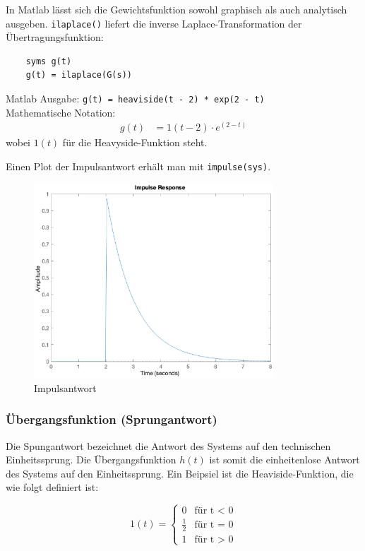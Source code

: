 In Matlab lässt sich die Gewichtsfunktion sowohl graphisch als auch analytisch ausgeben.
\texttt{ilaplace()} liefert die inverse Laplace-Transformation der Übertragungsfunktion:
\begin{verbatim}
    syms g(t)
    g(t) = ilaplace(G(s))
\end{verbatim}

Matlab Ausgabe: \texttt{g(t) = heaviside(t - 2) * exp(2 - t)}\\
Mathematische Notation: 
\begin{align*}
    g(t) &=1(t-2)\cdot e^{(2-t)}
\end{align*} wobei $1(t)$ für die Heavyside-Funktion steht.

Einen Plot der Impulsantwort erhält man mit \texttt{impulse(sys)}.

\begin{figure}[H]
    \label{fig:impuls}
    \centering
    \includegraphics[width=0.8\textwidth]{Bilder/ImpulsAntwortPT1Tt.eps}
    \caption{Impulsantwort}
 \end{figure}

\subsubsection{Übergangsfunktion (Sprungantwort)}

Die Spungantwort bezeichnet die Antwort des Systems auf den technischen Einheitssprung.
Die Übergangsfunktion $h(t)$ ist somit die einheitenlose Antwort des Systems auf den Einheitssprung.
Ein Beipsiel ist die Heaviside-Funktion, die wie folgt definiert ist:

\[
1 (t) = \begin{cases} 
    0 & \text{für t < 0} \\ 
    \frac{1}{2} & \text{für t = 0} \\
    1 & \text{für t > 0} \end{cases}  
\]

